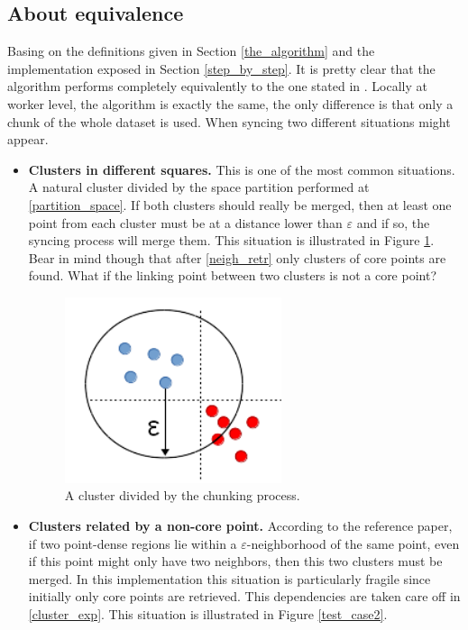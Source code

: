\documentclass[10pt,journal,compsoc]{IEEEtran}
\let\MYoriglatexcaption\caption
\renewcommand{\caption}[2][\relax]{\MYoriglatexcaption[#2]{#2}}
\begin{document}
\subsection{About equivalence}

Basing on the definitions given in Section \ref{the_algorithm} and the implementation exposed in Section \ref{step_by_step}. It is pretty clear that the algorithm performs completely equivalently to the one stated in \cite{ReferencePaper}. Locally at worker level, the algorithm is exactly the same, the only difference is that only a chunk of the whole dataset is used. When syncing two different situations might appear.
\begin{itemize}
\item \textbf{Clusters in different squares.} This is one of the most common situations. A natural cluster divided by the space partition performed at \ref{partition_space}. If both clusters should really be merged, then at least one point from each cluster must be at a distance lower than $\varepsilon$ and if so, the syncing process will merge them. This situation is illustrated in Figure \ref{test_case1}. Bear in mind though that after \ref{neigh_retr} only clusters of core points are found.  What if the linking point between two clusters is not a core point?
\begin{figure}[!h]
\centering
\includegraphics[width=2.5in]{img/test_case1.png}
\caption{A cluster divided by the chunking process.}
\label{test_case1}
\end{figure}
\item \textbf{Clusters related by a non-core point.} According to the reference paper, if two point-dense regions lie within a $\varepsilon$-neighborhood of the same point, even if this point might only have two neighbors, then this two clusters must be merged. In this implementation this situation is particularly fragile since initially only core points are retrieved. This dependencies are taken care off in \ref{cluster_exp}. This situation is illustrated in Figure \ref{test_case2}.

\end{itemize}
\end{document}
